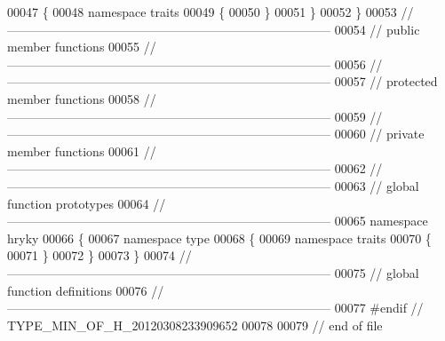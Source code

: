 \begin{DoxyCode}
00047 \{
00048 \textcolor{keyword}{namespace }traits
00049 \{
00050 \}
00051 \}
00052 \}
00053 \textcolor{comment}{//
      ------------------------------------------------------------------------------}
00054 \textcolor{comment}{// public member functions}
00055 \textcolor{comment}{//
      ------------------------------------------------------------------------------}
00056 \textcolor{comment}{//
      ------------------------------------------------------------------------------}
00057 \textcolor{comment}{// protected member functions}
00058 \textcolor{comment}{//
      ------------------------------------------------------------------------------}
00059 \textcolor{comment}{//
      ------------------------------------------------------------------------------}
00060 \textcolor{comment}{// private member functions}
00061 \textcolor{comment}{//
      ------------------------------------------------------------------------------}
00062 \textcolor{comment}{//
      ------------------------------------------------------------------------------}
00063 \textcolor{comment}{// global function prototypes}
00064 \textcolor{comment}{//
      ------------------------------------------------------------------------------}
00065 \textcolor{keyword}{namespace }hryky
00066 \{
00067 \textcolor{keyword}{namespace }type
00068 \{
00069 \textcolor{keyword}{namespace }traits
00070 \{
00071 \}
00072 \}
00073 \}
00074 \textcolor{comment}{//
      ------------------------------------------------------------------------------}
00075 \textcolor{comment}{// global function definitions}
00076 \textcolor{comment}{//
      ------------------------------------------------------------------------------}
00077 \textcolor{preprocessor}{#endif // TYPE\_MIN\_OF\_H\_20120308233909652}
00078 \textcolor{preprocessor}{}
00079 \textcolor{comment}{// end of file}
\end{DoxyCode}

